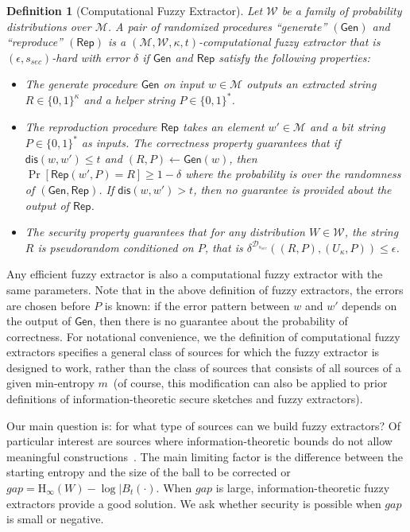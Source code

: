 \documentclass[11pt]{article}
\newcommand{\defref}[1]{\mbox{Definition~\ref{#1}}}
\newcommand{\class}[1]{{\ensuremath{\mathsf{#1}}}}
\newcommand{\gen}{\ensuremath{\class{Gen}}\xspace}
\newcommand{\rep}{\ensuremath{\class{Rep}}\xspace}
\newcommand{\dis}{\ensuremath{\mathsf{dis}}}
\newcommand{\Hoo}{\mathrm{H}_\infty}
\newtheorem{definition}[theorem]{Definition}
\begin{document}
\begin{definition}[Computational Fuzzy Extractor]\label{def:comp fuzzy extractor}
Let $\mathcal{W}$ be a family of probability distributions over $\mathcal{M}$. A pair of randomized procedures ``generate'' $(\gen)$ and ``reproduce'' $(\rep)$ is a $(\mathcal{M}, \mathcal{W}, \kappa, t)$-\emph{computational fuzzy extractor} that is $(\epsilon, s_{sec})$-hard with error $\delta$ if \gen and \rep satisfy the following properties:
\begin{itemize}
\item The generate procedure \gen on input $w\in \mathcal{M}$ outputs an extracted string $R\in\{0,1\}^\kappa$ and a helper string $P\in\{0,1\}^*$.
\item The reproduction procedure \rep takes an element $w'\in\mathcal{M}$ and a bit string $P\in\{0,1\}^*$ as inputs.  The \emph{correctness} property guarantees that if $\dis(w, w')\leq t$ and $(R, P)\leftarrow \gen(w)$, then $\Pr[\rep( w', P) = R] \geq 1-\delta$ where the probability is over the randomness of $(\gen, \rep)$.  
If $\dis(w, w') > t$, then no guarantee is provided about the output of \rep.
\item The \emph{security} property guarantees that for any distribution $W\in \mathcal{W}$, the string $R$ is pseudorandom conditioned on $P$, that is $\delta^{\mathcal{D}_{s_{sec}}}((R, P), (U_\kappa, P))\leq \epsilon$.
\end{itemize}
\end{definition}
Any efficient fuzzy extractor is also a computational fuzzy extractor with the same parameters.  
Note that in the above definition of fuzzy extractors, the errors are chosen before $P$ is known: if the error pattern between $w$ and $w'$ depends on the output of $\gen$, then there is no guarantee about the probability of correctness.
For notational convenience, we the definition of computational fuzzy extractors specifies a general class of sources for which the fuzzy extractor is designed to work, rather than the class of sources that consists of all sources of a given min-entropy $m$~(of course, this modification can also be applied to prior definitions of information-theoretic secure sketches and fuzzy extractors).


Our main question is: for what type of sources can we build fuzzy extractors?  Of particular interest are sources where information-theoretic bounds do not allow meaningful constructions~\cite[Lemmas C.1 and C.2]{DBLP:journals/siamcomp/DodisORS08}.  The main limiting factor is the difference between the starting entropy and the size of the ball to be corrected or $gap = \Hoo(W) - \log |B_t(\cdot)$.  When $gap$ is large, information-theoretic fuzzy extractors provide a good solution.  We ask whether security is possible when $gap$ is small or negative.
\end{document}
